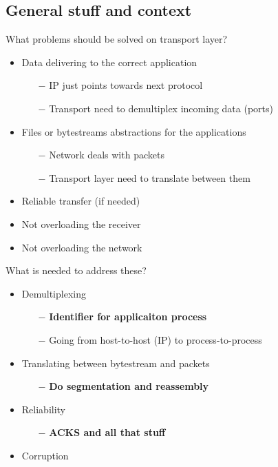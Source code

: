 \documentclass[a4paper, fontsize=8pt, landscape, DIV=1]{scrartcl}
\begin{document}
\begin{multicols*}{4}
		\subsection{General stuff and context}
		What problems should be solved on transport layer? 
		\begin{itemize}[noitemsep]
			\item Data delivering to the correct application
			\begin{itemize}
				\item[$-$] IP just points towards next protocol
				\item[$-$] Transport need to demultiplex incoming data (ports)
			\end{itemize}
			\item Files or bytestreams abstractions for the applications
			\begin{itemize}
				\item[$-$] Network deals with packets
				\item[$-$] Transport layer need to translate between them
			\end{itemize}
			\item Reliable transfer (if needed)
			\item Not overloading the receiver
			\item Not overloading the network
		\end{itemize}
		What is needed to address these? 
		\begin{itemize}[noitemsep]
			\item Demultiplexing 
			\begin{itemize}
				\item[$-$] \textbf{Identifier for applicaiton process}
				\item[$-$] Going from host-to-host (IP) to process-to-process
			\end{itemize}
			\item Translating between bytestream and packets
			\begin{itemize}
				\item[$-$] \textbf{Do segmentation and reassembly}
			\end{itemize}
			\item Reliability
			\begin{itemize}
				\item[$-$] \textbf{ACKS and all that stuff}
			\end{itemize}
			\item Corruption
			\begin{itemize}

\end{itemize}
\end{itemize}
\end{multicols*}
\end{document}

